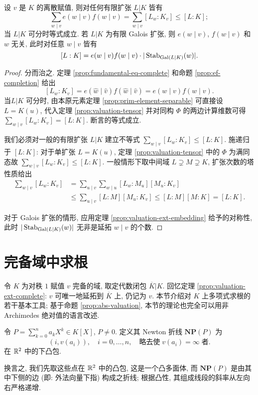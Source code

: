 \begin{corollary}[赋值论基本等式]\label{prop:fundamental-eq}
	设 $v$ 是 $K$ 的离散赋值, 则对任何有限扩张 $L|K$ 皆有
	\[ \sum_{w \mid v} e(w \mid v) f(w \mid v) = \sum_{w \mid v} [L_w : K_v] \leq [L:K]; \]
	当 $L|K$ 可分时等式成立. 若 $L|K$ 为有限 Galois 扩张, 则 $e(w \mid v)$, $f(w \mid v)$ 和 $w$ 无关, 此时对任意 $w \mid v$ 皆有
	\[ [L:K] = e(w \mid v) f(w \mid v) \cdot |\operatorname{Stab}_{\operatorname{Gal}(L|K)}(w)|. \]
\end{corollary}
\begin{proof}
	分而治之. 定理 \ref{prop:fundamental-eq-complete} 和命题 \ref{prop:ef-completion} 给出
	\[ [L_w:K_v] = e(\hat{w} \mid \hat{v}) f(\hat{w} \mid \hat{v}) = e(w \mid v) f(w \mid v). \]
	当$L|K$ 可分时, 由本原元素定理 \ref{prop:prim-element-separable} 可直接设 $L=K(u)$, 代入定理 \ref{prop:valuation-tensor} 并对同构 $\Phi$ 的两边计算维数可得 $\sum_{w \mid v} [L_w : K_v] = [L:K]$. 断言的等式成立.
	
	我们必须对一般的有限扩张 $L|K$ 建立不等式 $\sum_{w \mid v} [L_w : K_v] \leq [L:K]$. 施递归于 $[L:K]$: 对于单扩张 $L=K(u)$, 定理 \ref{prop:valuation-tensor} 中的 $\Phi$ 为满同态故 $\sum_{w \mid v} [L_w : K_v] \leq [L:K]$. 一般情形下取中间域 $L \supsetneq M \supsetneq K$, 扩张次数的塔性质给出
	\begin{align*}
		\sum_{w \mid v} [L_w : K_v] & = \sum_{u \mid v} \sum_{w \mid u} [L_w : M_u] [M_u : K_v] \\
		& \leq \sum_{u \mid v} [L:M] [M_u:K_v] \leq [L:M][M:K] = [L:K].
	\end{align*}

	对于 Galois 扩张的情形, 应用定理 \ref{prop:valuation-ext-embedding} 给予的对称性, 此时 $|\operatorname{Stab}_{\operatorname{Gal}(L|K)}(w)|$ 无非是延拓 $w \mid v$ 的个数.
\end{proof}

\section{完备域中求根}
令 $K$ 为对秩 $1$ 赋值 $v$ 完备的域, 取定代数闭包 $\overline{K}|K$. 回忆定理 \ref{prop:valuation-ext-complete}: $v$ 可唯一地延拓到 $\overline{K}$ 上, 仍记为 $v$. 本节介绍对 $K$ 上多项式求根的若干基本工具; 基于命题 \ref{prop:abs-valuation}, 本节的理论也完全可以用非 Archimedes 绝对值的语言改述.

\begin{definition}[Newton 折线]
	令 $P = \sum_{k=0}^n a_k X^k \in K[X]$, $P \neq 0$. 定义其 Newton 折线 $\textbf{NP}(P)$ 为
	\[ (i, v(a_i)), \quad i=0, \ldots, n, \quad \text{略去使}\; v(a_i)=\infty\; \text{者}. \]
	在 $\mathbb{R}^2$ 中的下凸包.
\end{definition}
换言之, 我们先取这些点在 $\mathbb{R}^2$ 中的凸包, 这是一个凸多面体, 而 $\textbf{NP}(P)$ 是由其中下侧的边 (即: 外法向量下指) 构成之折线; 根据凸性, 其组成线段的斜率从左向右严格递增.

